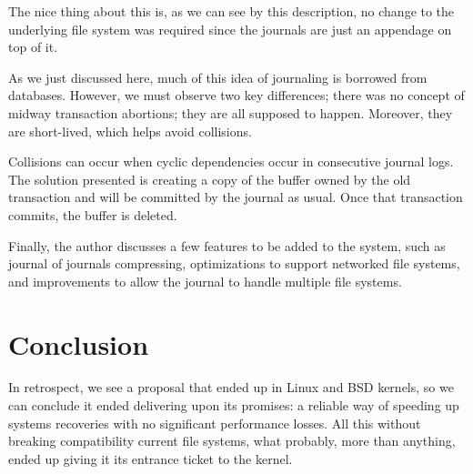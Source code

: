 \documentclass[12pt]{article}
\begin{document}
The nice thing about this is, as we can see by this description, no change to the underlying file system was required since the journals are just an appendage on top of it.

As we just discussed here, much of this idea of journaling is borrowed from databases. However, we must observe two key differences; there was no concept of midway transaction abortions; they are all supposed to happen. Moreover, they are short-lived, which helps avoid collisions.

Collisions can occur when cyclic dependencies occur in consecutive journal logs. The solution presented is creating a copy of the buffer owned by the old transaction and will be committed by the journal as usual. Once that transaction commits, the buffer is deleted.

Finally, the author discusses a few features to be added to the system, such as journal of journals compressing, optimizations to support networked file systems, and improvements to allow the journal to handle multiple file systems.

\section{Conclusion}
In retrospect, we see a proposal that ended up in Linux and BSD kernels, so we can conclude it ended delivering upon its promises: a reliable way of speeding up systems recoveries with no significant performance losses. All this without breaking compatibility current file systems, what probably, more than anything, ended up giving it its entrance ticket to the kernel.



\end{document}
